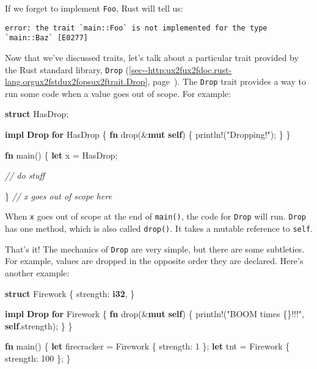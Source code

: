 \documentclass[a4paper,]{book}
\renewcommand*{\hyperref}[2][\ar]{%
  \def\ar{#2}%
  #2 (\autoref{#1}, page~\pageref{#1})}
\newenvironment{Shaded}{\begin{snugshade}}{\end{snugshade}}
\newcommand{\KeywordTok}[1]{\textcolor[rgb]{0.13,0.29,0.53}{\textbf{{#1}}}}
\newcommand{\DecValTok}[1]{\textcolor[rgb]{0.00,0.00,0.81}{{#1}}}
\newcommand{\StringTok}[1]{\textcolor[rgb]{0.31,0.60,0.02}{{#1}}}
\newcommand{\CommentTok}[1]{\textcolor[rgb]{0.56,0.35,0.01}{\textit{{#1}}}}
\newcommand{\OtherTok}[1]{\textcolor[rgb]{0.56,0.35,0.01}{{#1}}}
\newcommand{\NormalTok}[1]{{#1}}
\begin{document}
If we forget to implement \texttt{Foo}, Rust will tell us:

\begin{verbatim}
error: the trait `main::Foo` is not implemented for the type `main::Baz` [E0277]
\end{verbatim}


Now that we've discussed traits, let's talk about a particular trait
provided by the Rust standard library,
\hyperref[sec--http:ux2fux2fdoc.rust-lang.orgux2fstdux2fopsux2ftrait.Drop]{\texttt{Drop}}.
The \texttt{Drop} trait provides a way to run some code when a value
goes out of scope. For example:

\begin{Shaded}
\begin{Highlighting}[]
\KeywordTok{struct} \NormalTok{HasDrop;}

\KeywordTok{impl} \KeywordTok{Drop} \KeywordTok{for} \NormalTok{HasDrop \{}
    \KeywordTok{fn} \NormalTok{drop(&}\KeywordTok{mut} \KeywordTok{self}\NormalTok{) \{}
        \OtherTok{println!}\NormalTok{(}\StringTok{"Dropping!"}\NormalTok{);}
    \NormalTok{\}}
\NormalTok{\}}

\KeywordTok{fn} \NormalTok{main() \{}
    \KeywordTok{let} \NormalTok{x = HasDrop;}

    \CommentTok{// do stuff}

\NormalTok{\} }\CommentTok{// x goes out of scope here}
\end{Highlighting}
\end{Shaded}

When \texttt{x} goes out of scope at the end of \texttt{main()}, the
code for \texttt{Drop} will run. \texttt{Drop} has one method, which is
also called \texttt{drop()}. It takes a mutable reference to
\texttt{self}.

That's it! The mechanics of \texttt{Drop} are very simple, but there are
some subtleties. For example, values are dropped in the opposite order
they are declared. Here's another example:

\begin{Shaded}
\begin{Highlighting}[]
\KeywordTok{struct} \NormalTok{Firework \{}
    \NormalTok{strength: }\KeywordTok{i32}\NormalTok{,}
\NormalTok{\}}

\KeywordTok{impl} \KeywordTok{Drop} \KeywordTok{for} \NormalTok{Firework \{}
    \KeywordTok{fn} \NormalTok{drop(&}\KeywordTok{mut} \KeywordTok{self}\NormalTok{) \{}
        \OtherTok{println!}\NormalTok{(}\StringTok{"BOOM times \{\}!!!"}\NormalTok{, }\KeywordTok{self}\NormalTok{.strength);}
    \NormalTok{\}}
\NormalTok{\}}

\KeywordTok{fn} \NormalTok{main() \{}
    \KeywordTok{let} \NormalTok{firecracker = Firework \{ strength: }\DecValTok{1} \NormalTok{\};}
    \KeywordTok{let} \NormalTok{tnt = Firework \{ strength: }\DecValTok{100} \NormalTok{\};}
\NormalTok{\}}
\end{Highlighting}
\end{Shaded}
\end{document}
